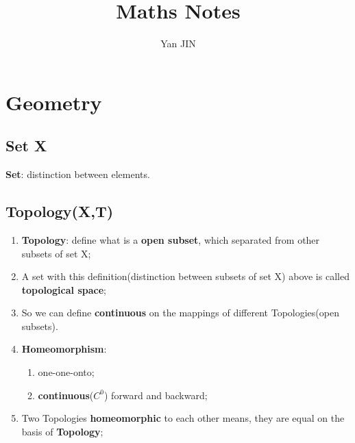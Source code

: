 \documentclass[12pt]{article}
\numberwithin{equation}{section}
\begin{document}
\small
\title{Maths Notes}
\author{Yan JIN}
\pagestyle{fancy}\fancyhf{}
\lhead{}
\lfoot{\textit{}}\cfoot{}\rfoot{\thepage}
\renewcommand{\headrulewidth}{1.pt}
\renewcommand{\footrulewidth}{1.pt}
\maketitle
\tableofcontents
\section{Geometry}
\subsection{Set X}
	\textbf{Set}: distinction between elements.
\subsection{Topology(X,T)}
	\begin{enumerate}
	\item \textbf{Topology}: define what is a \textbf{open subset}, which separated from other subsets of set X;
	\item A set with this definition(distinction between subsets of set X) above is called \textbf{topological space};
	\item So we can define \textbf{continuous} on the mappings of different Topologies(open subsets).
	\item \textbf{Homeomorphism}: 
		\begin{enumerate}
			\item one-one-onto; 
			\item \textbf{continuous}($C^0$) forward and backward;
		\end{enumerate}
	\item Two Topologies \textbf{homeomorphic} to each other means, they are equal on the basis of 	\textbf{Topology};
	\end{enumerate}
\end{document}
